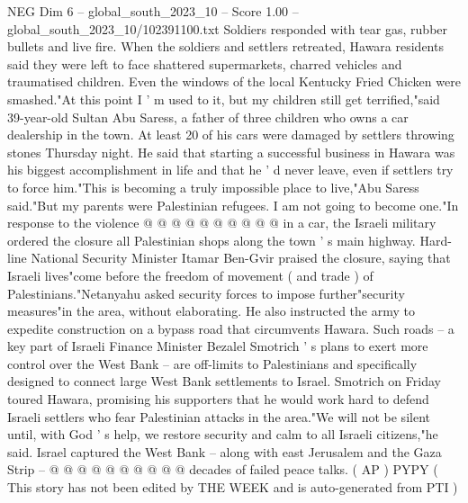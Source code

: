 \begin{textsample}{NEG Dim 6 – global\_south\_2023\_10 – Score 1.00 – global\_south\_2023\_10/102391100.txt}
Soldiers responded with tear gas, rubber bullets and live fire.
When the soldiers and settlers retreated, Hawara residents said they were left to face shattered supermarkets, charred vehicles and traumatised children.
Even the windows of the local Kentucky Fried Chicken were smashed."At this point I ' m used to it, but my children still get terrified,"said 39-year-old Sultan Abu Saress, a father of three children who owns a car dealership in the town.
At least 20 of his cars were damaged by settlers throwing stones Thursday night.
He said that starting a successful business in Hawara was his biggest accomplishment in life and that he ' d never leave, even if settlers try to force him."This is becoming a truly impossible place to live,"Abu Saress said."But my parents were Palestinian refugees.
I am not going to become one."In response to the violence @ @ @ @ @ @ @ @ @ @ in a car, the Israeli military ordered the closure all Palestinian shops along the town ' s main highway.
Hard-line National Security Minister Itamar Ben-Gvir praised the closure, saying that Israeli lives"come before the freedom of movement ( and trade ) of Palestinians."Netanyahu asked security forces to impose further"security measures"in the area, without elaborating.
He also instructed the army to expedite construction on a bypass road that circumvents Hawara.
Such roads -- a key part of Israeli Finance Minister Bezalel Smotrich ' s plans to exert more control over the West Bank -- are off-limits to Palestinians and specifically designed to connect large West Bank settlements to Israel.
Smotrich on Friday toured Hawara, promising his supporters that he would work hard to defend Israeli settlers who fear Palestinian attacks in the area."We will not be silent until, with God ' s help, we restore security and calm to all Israeli citizens,"he said.
Israel captured the West Bank -- along with east Jerusalem and the Gaza Strip -- @ @ @ @ @ @ @ @ @ @ decades of failed peace talks. ( AP ) PYPY ( This story has not been edited by THE WEEK and is auto-generated from PTI )

\end{textsample}
